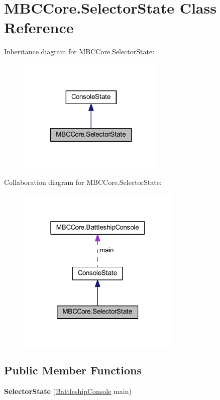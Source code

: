 \hypertarget{class_m_b_c_core_1_1_selector_state}{\section{M\-B\-C\-Core.\-Selector\-State Class Reference}
\label{class_m_b_c_core_1_1_selector_state}
}


Inheritance diagram for M\-B\-C\-Core.\-Selector\-State\-:\nopagebreak
\begin{figure}[H]
\begin{center}
\leavevmode
\includegraphics[width=200pt]{class_m_b_c_core_1_1_selector_state__inherit__graph}
\end{center}
\end{figure}


Collaboration diagram for M\-B\-C\-Core.\-Selector\-State\-:\nopagebreak
\begin{figure}[H]
\begin{center}
\leavevmode
\includegraphics[width=220pt]{class_m_b_c_core_1_1_selector_state__coll__graph}
\end{center}
\end{figure}
\subsection*{Public Member Functions}
\begin{DoxyCompactItemize}
\item 
\hypertarget{class_m_b_c_core_1_1_selector_state_a2eccfe2e04507edbd4958fdd5ead7ae7}{{\bfseries Selector\-State} (\hyperlink{class_m_b_c_core_1_1_battleship_console}{Battleship\-Console} main)}\label{class_m_b_c_core_1_1_selector_state_a2eccfe2e04507edbd4958fdd5ead7ae7}

\end{DoxyCompactItemize}
